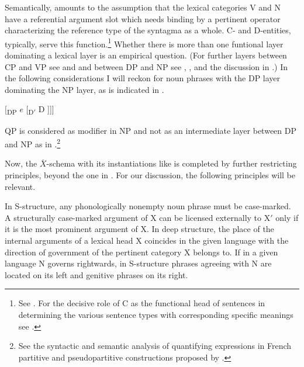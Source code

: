 \documentclass[output=paper,colorlinks,citecolor=brown]{langscibook}
\begin{document}
\noindent Semantically,  amounts to the assumption that the lexical categories V and N have a referential argument slot which needs binding by a pertinent operator characterizing the reference type of the syntagma as a whole. C- and D-entities, typically, serve this function.\footnote{See \citet{Zimmermann90Zur-Legitimierung}. For the decisive role of C as the functional head of sentences in determining the various sentence types with corresponding specific meanings see \citet{Brandt89Satzmodus-Modalitat}.} Whether there is more than one funtional layer dominating a lexical layer is an empirical question. (For further layers between CP and VP see \citealt{Pollock89Verb-movement} and \citealt{Chomsky89Some-notes} and between DP and NP see \citealt{Lobel89Q-as-functional, Lobel90Functional-categories, Lobel88D-und-Q, Lobel90On-the-parametrization}, \citealt{Delsing88The-Scandinavian, Delsing90A-DP-analysis}, \citealt{Bhatt90Die-syntaktische} and the discussion in \citealt{Zimmermann91Die-Syntax-Substantivgruppe}.) In the following considerations I will reckon for noun phrases with the DP layer dominating the NP layer, as is indicated in .

\ea \label{ex:zi91:11} $[$\textsubscript{DP} $e$ [\textsubscript{D$'$} D \; [\textsubscript{NP} $e$ [\textsubscript{N$'$} ... (QP) ... N ...]]]]
\z

\noindent QP is considered as modifier in NP and not as an intermediate layer between DP and NP as in \citet{Zimmermann89The-subject, Zimmermann90Pranominale-Argument}.\footnote{See the syntactic and semantic analysis of quantifying expressions in French partitive and pseudopartitive constructions proposed by \citet{Burchert90Zur-Syntax}.}

Now, the $\overline{X}$-schema  with its instantiations like  is completed by further restricting principles, beyond the one in . For our discussion, the following principles will be relevant.

\ea \label{ex:zi91:12} In S-structure, any phonologically nonempty noun phrase must be case-marked.
\ex \label{ex:zi91:13} A structurally case-marked argument of X can be licensed externally to X$'$ only if it is the most prominent argument of X. 
\ex \label{ex:zi91:14} In deep structure, the place of the internal arguments of a lexical head X coincides in the given language with the direction of government of the pertinent category X belongs to.
\ex \label{ex:zi91:15} If in a given language N governs rightwards, in S-structure phrases agreeing with N are located on its left and genitive phrases on its right.
\z
\end{document}
